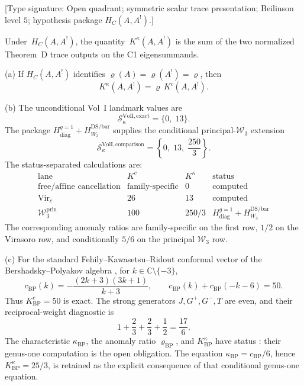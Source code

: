 \begin{theorem}
\label{thm:scalar-trace-complementarity}
\label{thm:derived-centre-complementarity-strengthened}
\textup{[Type signature: Open quadrant; symmetric scalar trace
presentation; Beilinson level \(5\); hypothesis package
\(H_C(A,A^!)\).]}

Under~$H_C(A,A^!)$, the quantity~$K^\kappa(A,A^!)$ is the sum of the
two normalized Theorem~D trace outputs on the C1 eigensummands.

\textup{(a)} If \(H_C(A,A^!)\) identifies
\(\varrho(A)=\varrho(A^!)=\varrho\), then
\begin{equation}\label{eq:thm-C-bridge}
 K^\kappa(A,A^!)=\varrho\,K^c(A,A^!).
\end{equation}

\textup{(b)} The unconditional Vol~I landmark values are
\[
 \mathcal S^{\mathrm{VolI,exact}}_\kappa=\{0,\;13\}.
\]
The package
$H_{\mathrm{diag}}^{g=1}+H_{W_3}^{\mathrm{DS/bar}}$ supplies the
conditional principal-$\mathcal W_3$ extension
\begin{equation}\label{eq:thm-C-ceiling}
 \mathcal S^{\mathrm{VolI,comparison}}_\kappa
 =
 \left\{0,\;13,\;\frac{250}{3}\right\}.
\end{equation}
The status-separated calculations are:
\[
\begin{array}{c|c|c|c}
\text{lane} & K^c & K^\kappa & \text{status}\\
\hline
\text{free/affine cancellation} & \text{family-specific} & 0 &
\text{computed}\\
\operatorname{Vir}_c & 26 & 13 & \text{computed}\\
\mathcal W_3^{\mathrm{prin}} & 100 & 250/3 &
H_{\mathrm{diag}}^{g=1}+H_{W_3}^{\mathrm{DS/bar}}
\end{array}
\]
The corresponding anomaly ratios are family-specific on the first row,
$1/2$ on the Virasoro row, and conditionally $5/6$ on the principal
$\mathcal W_3$ row.

\textup{(c)} For the standard Fehily--Kawasetsu--Ridout conformal
vector of the Bershadsky--Polyakov algebra
\cite[Definition~2.1]{FKR20}, for \(k\in\mathbb C\setminus\{-3\}\),
\[
 c_{\mathrm{BP}}(k)
 =
 -\frac{(2k+3)(3k+1)}{k+3},
 \qquad
 c_{\mathrm{BP}}(k)+c_{\mathrm{BP}}(-k-6)=50.
\]
Thus \(K^c_{\mathrm{BP}}=50\) is exact.  The strong generators
\(J,G^+,G^-,T\) are even, and their reciprocal-weight diagnostic is
\[
 1+\frac23+\frac23+\frac12=\frac{17}{6}.
\]
The characteristic \(\kappa_{\mathrm{BP}}\), the anomaly ratio
\(\varrho_{\mathrm{BP}}\), and
\(K^\kappa_{\mathrm{BP}}\) have status \ClaimStatusOpen{}: their
genus-one computation is the open obligation.  The equation
\(\kappa_{\mathrm{BP}}=c_{\mathrm{BP}}/6\), hence
\(K^\kappa_{\mathrm{BP}}=25/3\), is retained as the explicit
consequence of that conditional genus-one equation.


\end{theorem}
